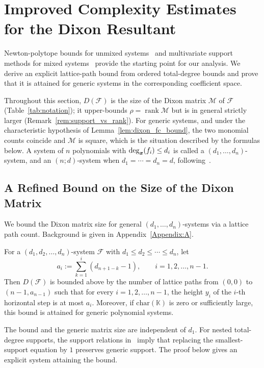 \section{Improved Complexity Estimates for the Dixon Resultant}\label{Section:Complexity}

Newton-polytope bounds for unmixed systems~\cite{DBLP:conf/stoc/KapurS96} and multivariate support methods for mixed systems~\cite{ChtcherbaKapur2004} provide the starting point for our analysis. We derive an explicit lattice-path bound from ordered total-degree bounds and prove that it is attained for generic systems in the corresponding coefficient space.

Throughout this section, $D(\mathcal{F})$ is the size of the Dixon matrix $\mathcal{M}$ of $\mathcal{F}$ (Table~\ref{tab:notation}); it upper-bounds $\rho=\operatorname{rank}\mathcal{M}$ but is in general strictly larger (Remark~\ref{rem:support_vs_rank}). For generic systems, and under the characteristic hypothesis of Lemma~\ref{lem:dixon_fc_bound}, the two monomial counts coincide and $\mathcal{M}$ is square, which is the situation described by the formulas below. A system of $n$ polynomials with $\deg_{{\boldsymbol{x}}}(f_i)\le d_i$ is called a $(d_1,\ldots,d_n)$-system, and an $(n;d)$-system when $d_1=\cdots=d_n=d$, following~\cite{DBLP:conf/stoc/KapurS96}.

\subsection{A Refined Bound on the Size of the Dixon Matrix}\label{Subsection:Matrix_Size}

We bound the Dixon matrix size for general $(d_1,\ldots,d_n)$-systems via a lattice path count. Background is given in Appendix~\ref{Appendix:A}.

\begin{theorem}\label{thm:dixon_general_bound}
	For a $(d_1, d_2, \ldots, d_n)$-system $\mathcal{F}$ with 
	$d_1 \leq d_2 \leq \cdots \leq d_n$, 
	let
	\[
	a_i := \sum_{k=1}^{i} (d_{n+1-k}-1),
	\qquad i=1,2,\ldots,n-1.
	\]
	Then $D(\mathcal{F})$ is bounded above by the number of lattice paths 
	from $(0,0)$ to $(n-1, a_{n-1})$ such that for every 
	$i=1,2,\ldots,n-1$, the height $y_i$ of the $i$-th horizontal step is at most $a_i$.
	Moreover, if $\mathrm{char}(\mathbb{K})$ is zero or sufficiently large, this bound is attained for generic polynomial systems.
\end{theorem}

\begin{remark}\label{rem:minimum_degree}
The bound and the generic matrix size are independent of $d_1$. For nested total-degree supports, the support relations in~\cite[Theorems~3.1 and~5.1]{ChtcherbaKapur2004} imply that replacing the smallest-support equation by $1$ preserves generic support. The proof below gives an explicit system attaining the bound.
\end{remark}

